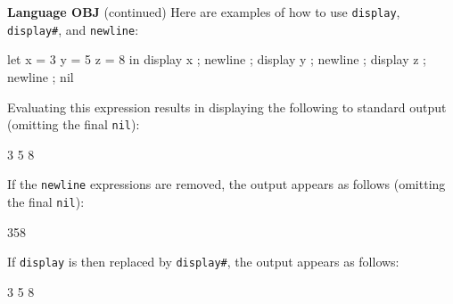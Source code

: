 \begin{minipage}[t]{\sw}
\slidenumber
\LARGE
{\bf Language OBJ} (continued)\exx
\Large
Here are examples
of how to use \verb'display', \verb'display#', and \verb'newline':
\begin{qv}
let
  x = 3
  y = 5
  z = 8
in
  { display x ; newline
  ; display y ; newline
  ; display z ; newline
  ; nil
  }
\end{qv}
Evaluating this expression results
in displaying the following
to standard output (omitting the final \verb'nil'):
\begin{qv}
3
5
8
\end{qv}
If the \verb'newline' expressions are removed,
the output appears as follows (omitting the final \verb'nil'):
\begin{qv}
358
\end{qv}
If \verb'display' is then replaced by \verb'display#',
the output appears as follows:
\begin{qv}
3 5 8
\end{qv}
\end{minipage}
